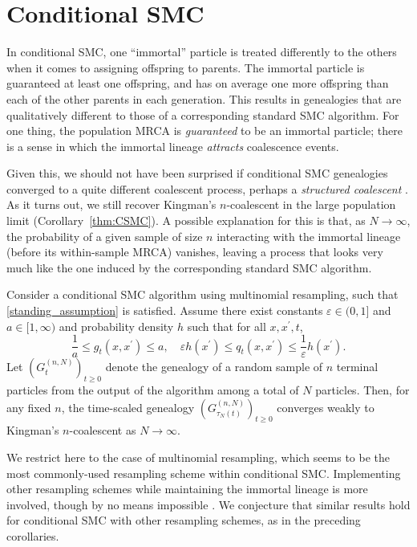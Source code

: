\section{Conditional SMC}
In conditional SMC, one ``immortal'' particle is treated differently to the others when it comes to assigning offspring to parents. The immortal particle is guaranteed at least one offspring, and has on average one more offspring than each of the other parents in each generation.
This results in genealogies that are qualitatively different to those of a corresponding standard SMC algorithm. For one thing, the population MRCA is \emph{guaranteed} to be an immortal particle; there is a sense in which the immortal lineage \emph{attracts} coalescence events.

Given this, we should not have been surprised if conditional SMC genealogies converged to a quite different coalescent process, perhaps a \emph{structured coalescent} \parencite{notohara1990}.
As it turns out, we still recover Kingman's $n$-coalescent in the large population limit (Corollary~\ref{thm:CSMC}). 
A possible explanation for this is that, as $N\to\infty$, the probability of a given sample of size $n$ interacting with the immortal lineage (before its within-sample MRCA) vanishes, leaving a process that looks very much like the one induced by the corresponding standard SMC algorithm.

\begin{corollary}\label{thm:CSMC}
Consider a conditional SMC algorithm using multinomial resampling, such that \ref{standing_assumption} is satisfied. Assume there exist constants $\varepsilon\in (0,1]$ and $a\in [1,\infty)$ and probability density $h$ such that for all $x, x^\prime, t$,
\begin{equation}\label{eq:gq_bounds_csmc}
\frac{1}{a} \leq g_t(x, x^\prime) \leq a , \quad
\varepsilon h(x^\prime) \leq q_t(x, x^\prime) \leq \frac{1}{\varepsilon} h(x^\prime) .
\end{equation}
Let $(G_t^{(n,N)})_{t\geq0}$ denote the genealogy of a random sample of $n$ terminal particles from the output of the algorithm among a total of $N$ particles. Then, for any fixed $n$, the time-scaled genealogy $(G_{\tau_N(t)}^{(n,N)})_{t\geq0}$ converges weakly to Kingman's $n$-coalescent as $N\to \infty$.%
\end{corollary}
We restrict here to the case of multinomial resampling, which seems to be the most commonly-used resampling scheme within conditional SMC. Implementing other resampling schemes while maintaining the immortal lineage is more involved, though by no means impossible \parencite{lee2019}.
We conjecture that similar results hold for conditional SMC with other resampling schemes, as in the preceding corollaries.

